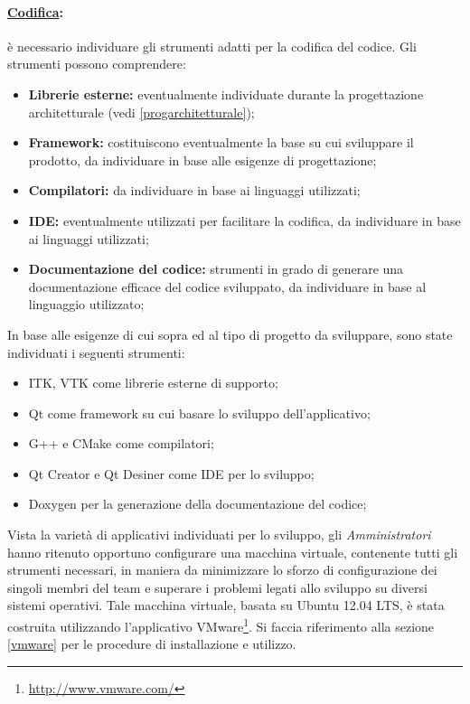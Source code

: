 \paragraph{\underline{Codifica}:} è necessario individuare gli strumenti adatti per la codifica del codice. Gli strumenti possono comprendere:
\begin{itemize}
\item \textbf{Librerie esterne:} eventualmente individuate durante la progettazione architetturale (vedi \ref{progarchitetturale});
\item \textbf{Framework:} costituiscono eventualmente la base su cui sviluppare il prodotto, da individuare in base alle esigenze di progettazione;
\item \textbf{Compilatori:} da individuare in base ai linguaggi utilizzati;
\item \textbf{IDE:} eventualmente utilizzati per facilitare la codifica, da individuare in base ai linguaggi utilizzati;
\item \textbf{Documentazione del codice:} strumenti in grado di generare una documentazione efficace del codice sviluppato, da individuare in base al linguaggio utilizzato;
\end{itemize}
In base alle esigenze di cui sopra ed al tipo di progetto da sviluppare, sono state individuati i seguenti strumenti:
\begin{itemize}
\item ITK\g{}, VTK\g{} come librerie esterne di supporto;
\item Qt\g{} come framework\g{} su cui basare lo sviluppo dell'applicativo;
\item G++ e CMake come compilatori;
\item Qt Creator e Qt Desiner come IDE\g{} per lo sviluppo;
\item Doxygen per la generazione della documentazione del codice;
\end{itemize}
Vista la varietà di applicativi individuati per lo sviluppo, gli \textit{Amministratori} hanno ritenuto opportuno configurare una macchina virtuale, contenente tutti gli strumenti necessari, in maniera da minimizzare lo sforzo di configurazione dei singoli membri del team e superare i problemi legati allo sviluppo su diversi sistemi operativi. Tale macchina virtuale, basata su Ubuntu 12.04 LTS, è stata costruita utilizzando l'applicativo VMware\footnote{\url{http://www.vmware.com/}}. Si faccia riferimento alla sezione \ref{vmware} per le procedure di installazione e utilizzo.

